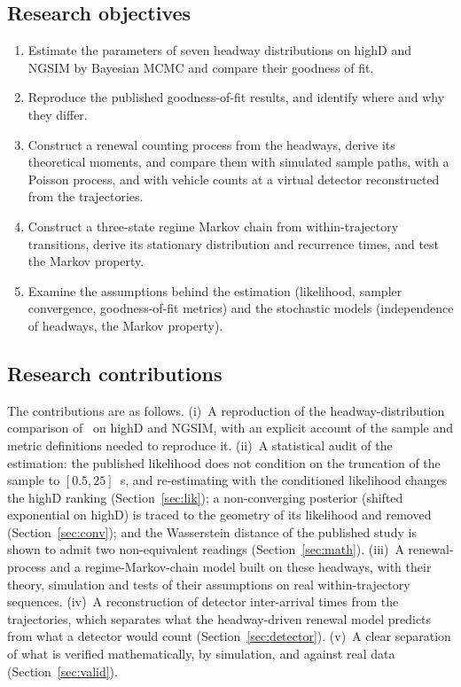 \documentclass[11pt,a4paper]{article}
\numberwithin{equation}{section}
\begin{document}
\subsection{Research objectives}
\begin{enumerate}
  \item Estimate the parameters of seven headway distributions on highD and NGSIM by Bayesian MCMC and compare their
        goodness of fit.
  \item Reproduce the published goodness-of-fit results, and identify where and why they differ.
  \item Construct a renewal counting process from the headways, derive its theoretical moments, and compare them with
        simulated sample paths, with a Poisson process, and with vehicle counts at a virtual detector reconstructed from the trajectories.
  \item Construct a three-state regime Markov chain from within-trajectory transitions, derive its stationary distribution and recurrence times, and
        test the Markov property.
  \item Examine the assumptions behind the estimation (likelihood, sampler convergence, goodness-of-fit metrics) and
        the stochastic models (independence of headways, the Markov property).
\end{enumerate}

\subsection{Research contributions}
The contributions are as follows.
(i)~A reproduction of the headway-distribution comparison of~\cite{leungbootnak} on highD and NGSIM, with an explicit
account of the sample and metric definitions needed to reproduce it.
(ii)~A statistical audit of the estimation: the published likelihood does not condition on the truncation of the sample to $[0.5,25]$~s, and
re-estimating with the conditioned likelihood changes the highD ranking (Section~\ref{sec:lik}); a non-converging posterior (shifted exponential on highD)
is traced to the geometry of its likelihood and removed (Section~\ref{sec:conv}); and the Wasserstein distance of the published study is shown to admit two non-equivalent readings (Section~\ref{sec:math}).
(iii)~A renewal-process and a regime-Markov-chain model built on these headways, with their theory, simulation and
tests of their assumptions on real within-trajectory sequences.
(iv)~A reconstruction of detector inter-arrival times from the trajectories, which separates what the headway-driven renewal model predicts from what a detector would count (Section~\ref{sec:detector}).
(v)~A clear separation of what is verified mathematically, by simulation, and against real data (Section~\ref{sec:valid}).
\end{document}
